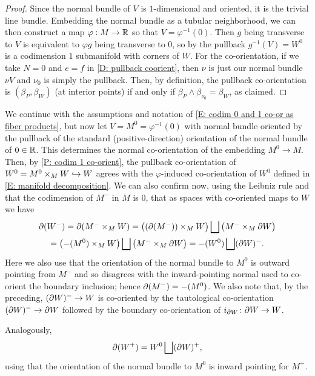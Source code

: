 \begin{proof}
	Since the normal bundle of $V$ is $1$-dimensional and oriented, it is the trivial line bundle.
	Embedding the normal bundle as a tubular neighborhood, we can then construct a map $\varphi: M \to \mathbb{R}$ so that $V = \varphi^{-1}(0)$.
	Then $g$ being transverse to $V$ is equivalent to $\varphi g$ being transverse to $0$, so by  \cite[Proposition 4.2.9]{MaDo92} the pullback $g^{-1}(V) = W^0$ is a codimension $1$ submanifold with corners of $W$.
	For the co-orientation, if we take $N = 0$ and $e = f$ in \cref{D: pullback coorient}, then $\nu$ is just our normal bundle $\nu V$ and $\nu_0$ is simply the pullback.
	Then, by definition, the pullback co-orientation is $(\beta_P, \beta_W)$ (at interior points) if and only if $\beta_P \wedge \beta_{\nu_0} = \beta_W$, as claimed.
\end{proof}

\begin{example}\label{E: codim 1 pullbacks}
	We continue with the assumptions and notation of \cref{E: codim 0 and 1 co-or as fiber products}, but now let $V = M^0 = \varphi^{-1}(0)$ with normal bundle oriented by the pullback of the standard (positive-direction) orientation of the normal bundle of $0 \in \mathbb{R}$.
	This determines the normal co-orientation of the embedding $M^0 \to M$.
	Then, by \cref{P: codim 1 co-orient}, the pullback co-orientation of $W^0 = M^0 \times_M W \hookrightarrow W$ agrees with the $\varphi$-induced co-orientation of $W^0$ defined in \cref{E: manifold decomposition}.
	We can also confirm now, using the Leibniz rule and that the codimension of $M^-$ in $M$ is $0$, that as spaces with co-oriented maps to $W$ we have
	\begin{multline*}
		\partial(W^-) = \partial(M^- \times_M W) = \left( (\partial (M^-)) \times_M W \right) \bigsqcup \left( M^- \times_M \partial W \right)\\
		= \left( -(M^0) \times_M W \right) \bigsqcup \left( M^- \times_M \partial W \right)= -(W^0) \bigsqcup (\partial W)^-.
	\end{multline*}
	Here we also use that the orientation of the normal bundle to $M^0$ is outward pointing from $M^-$ and so disagrees with the inward-pointing normal used to co-orient the boundary inclusion; hence $\partial(M^-) = -(M^0)$.
	We also note that, by the preceding, $(\partial W)^- \to W$ is co-oriented by the tautological co-orientation $(\partial W)^- \to \partial W$ followed by the boundary co-orientation of $i_{\partial W} \colon \partial W \to W$.

	Analogously,
	$$\partial (W^+) = W^0 \bigsqcup (\partial W)^+,$$
	using that the orientation of the normal bundle to $M^0$ is inward pointing for $M^+$.
\end{example}

